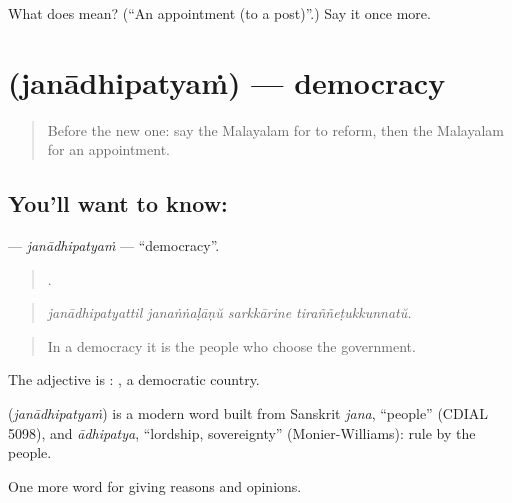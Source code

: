 \begin{tcolorbox}[breakable,colback=teal!4,colframe=teal!35!black,title={Before you move on}]
What does  mean? (\textquotedblleft{}An appointment (to a post)\textquotedblright{}.) Say it once more.
\end{tcolorbox}
\section[\texorpdfstring{\ml{ജനാധിപത്യം} (janādhipatyaṁ)}{ജനാധിപത്യം (janādhipatyaṁ)}]{ (janādhipatyaṁ) — democracy}

\label{lesson:ML-C424-janadhipatyam}



\begin{quote}
Before the new one: say the Malayalam for to reform, then the Malayalam for an appointment.
\end{quote}

\subsection*{You'll want to know: }
\textbf{} — \emph{janādhipatyaṁ} — \textquotedblleft{}democracy\textquotedblright{}.

\begin{quote}
   .
\end{quote}

\begin{quote}
\emph{janādhipatyattil janaṅṅaḷāṇŭ sarkkārine tiraññeṭukkunnatŭ.}
\end{quote}

\begin{quote}
In a democracy it is the people who choose the government.
\end{quote}

The adjective is :  , a democratic country.

\begin{cousinweb}
\textbf{} (\emph{janādhipatyaṁ}) is a modern word built from Sanskrit \emph{jana}, \textquotedblleft{}people\textquotedblright{} (CDIAL 5098), and \emph{ādhipatya}, \textquotedblleft{}lordship, sovereignty\textquotedblright{} (Monier-Williams): rule by the people.
\end{cousinweb}

\begin{grammarlens}[title={What you've built}]
One more word for giving reasons and opinions.
\end{grammarlens}

